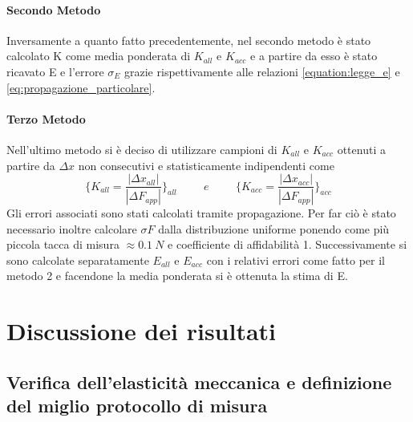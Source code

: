 \documentclass[a4paper,11pt,oneside]{article}
\begin{document}
\paragraph{Secondo Metodo} Inversamente a quanto fatto precedentemente, nel secondo metodo è stato calcolato K come media ponderata di $K_{all}$ e $K_{acc}$ e a partire da esso è stato ricavato E e l'errore $\sigma_{E}$ grazie rispettivamente alle relazioni \ref{equation:legge_e} e \ref{eq:propagazione_particolare}.

\paragraph{Terzo Metodo} Nell'ultimo metodo si è deciso di utilizzare campioni di $K_{all}$ e $K_{acc}$ ottenuti a partire da $\Delta x$  non consecutivi e statisticamente indipendenti come 
\begin{equation*}
    \biggl\{ K_{all} = \frac{|\Delta x_{all}|}{|\Delta F_{app}|}\biggr\}_{all}
    \hspace{1cm} e \hspace{1cm}
    \biggl\{ K_{acc} = \frac{|\Delta x_{acc}|}{|\Delta F_{app}|}\biggr\}_{acc}
\end{equation*}
Gli errori associati sono stati calcolati tramite propagazione. Per far ciò è stato necessario inoltre calcolare $\sigma F$ dalla distribuzione uniforme ponendo come più piccola tacca di misura $\approx \SI{0.1}{N}$ e coefficiente di affidabilità 1. Successivamente si sono calcolate separatamente $E_{all}$ e $E_{acc}$ con i relativi errori come fatto per il metodo 2 e facendone la media ponderata si è ottenuta la stima di E.


\newpage

\section{Discussione dei risultati}
\subsection{Verifica dell'elasticità meccanica e definizione del miglio protocollo di misura}\label{sec:discussione_prima_parte}
\end{document}
